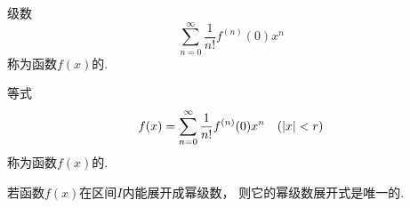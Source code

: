\begin{definition}
级数\begin{equation*}
	\sum_{n=0}^\infty \frac{1}{n!} f^{(n)}(0) x^n
\end{equation*}
称为函数\(f(x)\)的.

等式\begin{equation*}
	f(x) = \sum_{n=0}^\infty {\frac{1}{n!} f^{(n)}(0) x^n}
	\quad(\abs{x} < r)
\end{equation*}
称为函数\(f(x)\)的.
\end{definition}

\begin{theorem}
若函数\(f(x)\)在区间\(I\)内能展开成幂级数，
则它的幂级数展开式是唯一的.
\end{theorem}

